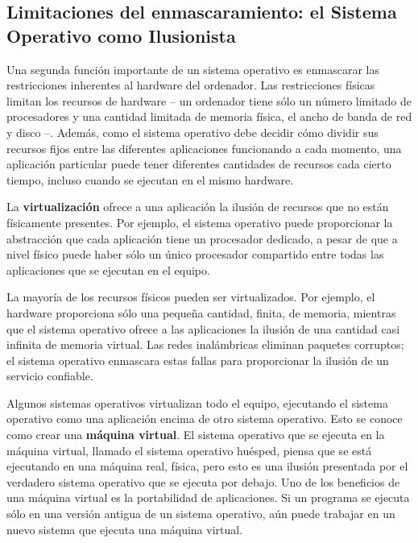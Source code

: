 \documentclass[10pt]{book}
\begin{document}
\subsection{Limitaciones del enmascaramiento: el Sistema Operativo como Ilusionista}
Una segunda función importante de un sistema operativo es enmascarar las restricciones inherentes al hardware del ordenador. Las restricciones físicas limitan los recursos de hardware -- un ordenador tiene sólo un número limitado de procesadores y una cantidad limitada de memoria física, el ancho de banda de red y disco --. Además, como el sistema operativo debe decidir cómo dividir sus recursos fijos entre las diferentes aplicaciones
funcionando a cada momento, una aplicación particular puede tener diferentes cantidades de recursos cada cierto tiempo, incluso cuando se ejecutan en el mismo hardware.

La \textbf{virtualización} ofrece a una aplicación la ilusión de recursos que no están físicamente presentes. Por ejemplo, el sistema operativo puede proporcionar la abstracción que cada aplicación tiene un procesador dedicado, a pesar de que a nivel físico puede haber sólo un único procesador compartido entre todas las aplicaciones que se ejecutan en el equipo.

La mayoría de los recursos físicos pueden ser virtualizados. Por ejemplo, el hardware proporciona sólo una pequeña cantidad, finita, de memoria, mientras que el sistema operativo ofrece a las aplicaciones la ilusión de una cantidad casi infinita de memoria virtual. Las redes inalámbricas eliminan paquetes corruptos; el sistema operativo enmascara estas fallas para proporcionar la ilusión de un servicio confiable.

Algunos sistemas operativos virtualizan todo el equipo, ejecutando el sistema operativo como una aplicación encima de otro sistema operativo. Esto se conoce como crear una \textbf{máquina virtual}. El sistema operativo que se ejecuta en la máquina virtual, llamado el sistema operativo huésped, piensa que se está ejecutando en una máquina real, física, pero esto es una ilusión presentada por el verdadero sistema operativo que se ejecuta por debajo. Uno de los beneficios de una máquina virtual es la portabilidad de aplicaciones. Si un programa se ejecuta sólo en una versión antigua de un sistema operativo, aún puede trabajar en un nuevo sistema que ejecuta una máquina virtual.
\end{document}
